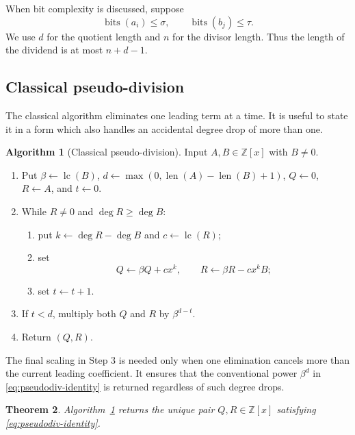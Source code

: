 \documentclass[11pt]{book}
\newtheorem{theorem}{Theorem}[section]
\theoremstyle{definition}
\newtheorem{algorithm}[theorem]{Algorithm}
\newcommand{\ZZ}{\mathbb Z}
\newcommand{\len}{\operatorname{len}}
\newcommand{\bits}{\operatorname{bits}}
\begin{document}
When bit complexity is discussed, suppose
\[
 \bits(a_i)\le\sigma,
 \qquad
 \bits(b_j)\le\tau.
\]
We use $d$ for the quotient length and $n$ for the divisor length.  Thus the
length of the dividend is at most $n+d-1$.

\subsection{Classical pseudo-division}

The classical algorithm eliminates one leading term at a time.  It is useful
to state it in a form which also handles an accidental degree drop of more
than one.

\begin{algorithm}[Classical pseudo-division]\label{alg:pseudodiv-classical}
Input $A,B\in\ZZ[x]$ with $B\ne0$.
\begin{enumerate}
 \item Put $\beta\leftarrow\operatorname{lc}(B)$,
 $d\leftarrow\max(0,\len(A)-\len(B)+1)$,
 $Q\leftarrow0$, $R\leftarrow A$, and $t\leftarrow0$.
 \item While $R\ne0$ and $\deg R\ge\deg B$:
 \begin{enumerate}
  \item put $k\leftarrow\deg R-\deg B$ and
  $c\leftarrow\operatorname{lc}(R)$;
  \item set
  \[
   Q\leftarrow\beta Q+c x^k,
   \qquad
   R\leftarrow\beta R-cx^kB;
  \]
  \item set $t\leftarrow t+1$.
 \end{enumerate}
 \item If $t<d$, multiply both $Q$ and $R$ by $\beta^{d-t}$.
 \item Return $(Q,R)$.
\end{enumerate}
\end{algorithm}

The final scaling in Step 3 is needed only when one elimination cancels more
than the current leading coefficient.  It ensures that the conventional
power $\beta^d$ in \eqref{eq:pseudodiv-identity} is returned regardless of
such degree drops.

\begin{theorem}\label{thm:pseudodiv-classical-correctness}
Algorithm~\ref{alg:pseudodiv-classical} returns the unique pair $Q,R\in\ZZ[x]$
satisfying \eqref{eq:pseudodiv-identity}.
\end{theorem}
\end{document}
